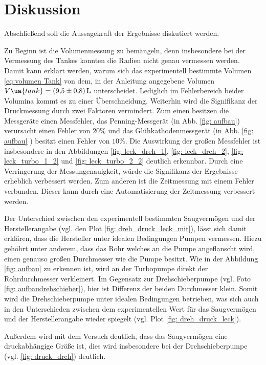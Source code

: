 \section{Diskussion}

Abschließend soll die Aussagekraft der Ergebnisse diskutiert werden. %

Zu Beginn ist die Volumenmessung zu bemängeln, denn insbesondere bei der Vermessung des Tankes
konnten die Radien nicht genau vermessen werden. Damit kann erklärt werden, warum sich das experimentell
bestimmte Volumen \eqref{eq:volumen Tank} von dem, in der Anleitung \cite{anleitung70} angegebene Volumen %
$V\ua{tank}=\SI{9.5\pm0,8}{\litre}$ unterscheidet. Lediglich im Fehlerbereich beider Volumina
kommt es zu einer Überschneidung.
Weiterhin wird die Signifikanz der Druckmessung durch zwei Faktoren vermindert.
Zum einen besitzen die Messgeräte einen Messfehler, das Penning-Messgerät (in Abb. \ref{fig: aufbau}) verursacht einen Fehler von $20\%$ und das %
Glühkathodenmessgerät (in Abb. \ref{fig: aufbau} ) besitzt einen Fehler von $10\%$. Die Auswirkung der großen Messfehler %
ist insbesondere in den Abbildungen \ref{fig: leck_dreh_1}, \ref{fig: leck_dreh_2}, \ref{fig: leck_turbo_1_2} und \ref{fig: leck_turbo_2_2} deutlich erkennbar. %
Durch eine Verringerung der Messungenauigkeit, würde die Signifikanz der Ergebnisse erheblich verbessert werden.
Zum anderen ist die Zeitmessung mit einem Fehler verbunden. Dieser kann durch eine Automatisierung der Zeitmessung verbessert werden.

Der Unterschied zwischen den experimentell bestimmten Saugvermögen und der Herstellerangabe (vgl. den Plot \ref{fig: dreh_druck_leck_mit}),
lässt sich damit erklären, dass die Hersteller unter idealen Bedingungen Pumpen vermessen. Hiezu gehöhrt unter anderem, dass das Rohr welches an die Pumpe angeflanscht wird,
einen genauso großen Durchmesser wie die Pumpe besitzt. Wie in der Abbildung \ref{fig: aufbau} zu erkennen ist, wird an der Turbopumpe direkt der
Rohrdurchmesser verkleinert. Im Gegensatz zur Drehschieberpumpe (vgl. Foto \ref{fig: aufbaudrehschieber}),
hier ist Differenz der beiden Durchmesser klein. Somit wird die Drehschieberpumpe unter idealen Bedingungen betrieben, was sich auch in den %
Unterschieden zwischen dem experimentellen Wert für das Saugvermögen und der Herstellerangabe wieder spiegelt (vgl. Plot \ref{fig: dreh_druck_leck}). %

Außerdem wird mit dem Versuch deutlich, dass das Saugvermögen eine druckabhängige Größe ist, dies wird insbesondere %
bei der Drehschieberpumpe (vgl. \ref{fig: druck_dreh}) deutlich.

